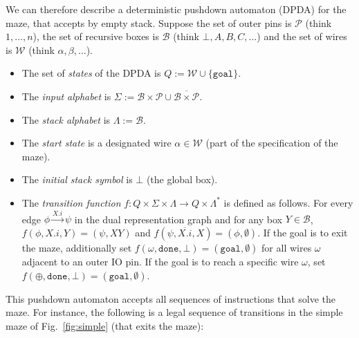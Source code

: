 \documentclass[a4paper,UKenglish,cleveref, autoref]{lipics-v2021}
\begin{document}
We can therefore describe a deterministic pushdown automaton (DPDA) for the
maze, that accepts by empty stack. Suppose the set of outer pins is
$\mathcal{P}$ (think $1, \dots, n$), the set of recursive boxes is $\mathcal{B}$
(think $\bot, A, B, C, \dots$) and the set of wires is $\mathcal{W}$ (think $\alpha, \beta,
\dots$). %
\begin{itemize}
\item The set of \emph{states} of the DPDA is $Q := \mathcal{W} \cup \{\texttt{goal} \}$.
\item The \emph{input alphabet} is $\Sigma := \mathcal{B} \times \mathcal{P} \cup \overline{\mathcal{B} \times \mathcal{P}}$.
\item The \emph{stack alphabet} is $\Lambda := \mathcal{B}$.
\item The \emph{start state} is a designated wire $\alpha \in \mathcal{W}$ (part of the specification of the maze).
\item The \emph{initial stack symbol} is $\bot$ (the global box).
\item The \emph{transition function}
  $f : Q \times \Sigma \times \Lambda \rightarrow Q \times \Lambda^*$ is defined
  as follows. For every edge $\phi \xrightarrow{X.i} \psi$ in the
  dual representation graph and for any box $Y \in \mathcal{B}$,
  $f(\phi, X.i, Y) = (\psi, XY)$ and
  $f(\psi, \overline{X.i}, X) = (\phi, \emptyset)$. If the goal is to exit the
  maze, additionally set $f(\omega, \texttt{done}, \bot) = (\texttt{goal}, \emptyset)$
  for all wires $\omega$ adjacent to an outer IO pin. If the goal is to reach a
  specific wire $\omega$, set
  $f(\oplus, \texttt{done}, \bot) = (\texttt{goal}, \emptyset)$.
\end{itemize}

This pushdown automaton accepts all sequences of instructions that solve the
maze. For instance, the following is a legal sequence of transitions in the
simple maze of Fig.~\ref{fig:simple} (that exits the maze):

\begin{center}
\noindent{}%
\end{center}
\end{document}
